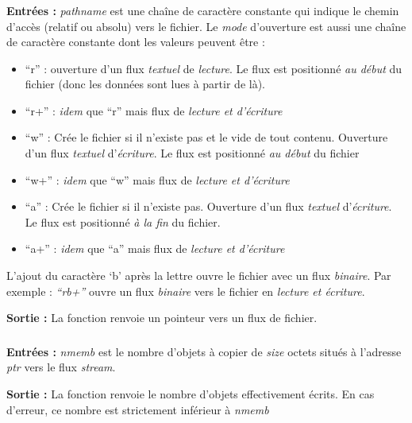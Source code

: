 \documentclass[../../../main.tex]{subfiles}
\begin{document}
\subsubsection{}
\label{ssub:fopen}
\textbf{Entrées :}\newline
\textit{pathname} est une chaîne de caractère constante qui indique le chemin d'accès (relatif ou absolu) vers le fichier. \newline
Le \textit{mode} d'ouverture est aussi une chaîne de caractère constante dont les valeurs peuvent être :
\begin{itemize}
	\item ``r'' : ouverture d'un flux \textit{textuel} de \textit{lecture}. Le flux est positionné \textit{au début} du fichier (donc les données sont lues à partir de là).
	\item ``r+'' : \textit{idem} que ``r'' mais flux de \textit{lecture et d'écriture}
	\item ``w'' : Crée le fichier si il n'existe pas et le vide de tout contenu. Ouverture d'un flux \textit{textuel} d'\textit{écriture}. Le flux est positionné \textit{au début} du fichier
	\item ``w+'' : \textit{idem} que ``w'' mais flux de \textit{lecture et d'écriture}
	\item ``a'' : Crée le fichier si il n'existe pas. Ouverture d'un flux \textit{textuel} d'\textit{écriture}. Le flux est positionné \textit{à la fin} du fichier.
	\item ``a+'' : \textit{idem} que ``a'' mais flux de \textit{lecture et d'écriture}
\end{itemize}
L'ajout du caractère `b' après la lettre ouvre le fichier avec un flux \textit{binaire}. Par exemple : \textit{``rb+''} ouvre un flux \textit{binaire} vers le fichier en \textit{lecture et écriture}.
 
\textbf{Sortie :} La fonction renvoie un pointeur vers un flux de fichier.
\subsubsection{}
\label{ssub:fwrite}
\textbf{Entrées :}\newline
\textit{nmemb} est le nombre d'objets à copier de \textit{size} octets situés à l'adresse \textit{ptr} vers le flux \textit{stream}.
 
\textbf{Sortie :} La fonction renvoie le nombre d'objets effectivement écrits. En cas d'erreur, ce nombre est strictement inférieur à \textit{nmemb}
\end{document}
